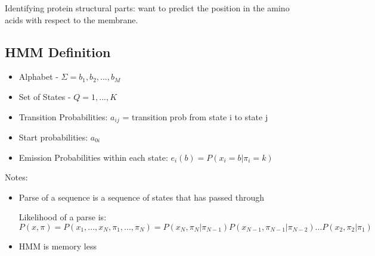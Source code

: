 \documentclass{article}
\begin{document}
Identifying protein structural parts: want to predict the position in the amino acids with respect to the membrane.

\subsection{HMM Definition}
\begin{itemize}
    \item Alphabet - $\Sigma = {b_1, b_2, ..., b_M}$
    \item Set of States - $Q = {1, ..., K}$
    \item Transition Probabilities: $a_{ij}$ = transition prob from state i to state j
    \item Start probabilities: $a_{0i}$
    \item Emission Probabilities within each state: $e_i(b) = P(x_i = b | \pi_i = k)$
\end{itemize}

Notes:
\begin{itemize}
    \item Parse of a sequence is a sequence of states that has passed through
    
    Likelihood of a parse is:
    $$P(x, \pi) = P(x_1, ..., x_N, \pi_1, ..., \pi_N) = P(x_N, \pi_N | \pi_{N-1})P(x_{N-1}, \pi_{N-1} | \pi_{N-2})...P(x_2, \pi_2 | \pi_1)$$
    \item HMM is memory less
\end{itemize}
\end{document}
